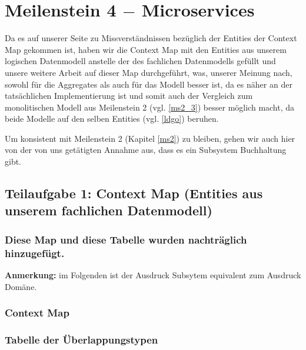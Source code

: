 \section{Meilenstein 4 $-$ Microservices}

Da es auf unserer Seite zu Missverst\"andnissen bez\"uglich
der Entities der Context Map gekommen ist, haben wir die
Context Map mit den Entities aus unserem logischen
Datenmodell anstelle der des fachlichen Datenmodells
gef\"ullt und unsere weitere Arbeit auf dieser
Map durchgef\"uhrt, was, unserer Meinung nach, sowohl f\"ur
die Aggregates als auch f\"ur das Modell besser ist, da es
n\"aher an der tats\"achlichen Implementierung ist und
somit auch der Vergleich zum monolitischen Modell aus
Meilenstein 2 (vgl. \ref{ms2_3}) besser m\"oglich macht, da
beide Modelle auf den selben Entities (vgl. \ref{ldgo})
beruhen.

Um konsistent mit Meilenstein 2 (Kapitel \ref{ms2}) zu
bleiben, gehen wir auch hier von der von uns get\"atigten
Annahme aus, dass es ein Subsystem Buchhaltung gibt.

\subsection*{Teilaufgabe 1: Context Map (Entities aus
  unserem fachlichen Datenmodell)}

\subsubsection*{Diese Map und diese Tabelle wurden
  nachtr\"aglich hinzugef\"ugt.}

\textbf{Anmerkung:} im Folgenden ist der Ausdruck Subsytem
equivalent zum Ausdruck Dom\"ane.

\subsubsection{Context Map}


\subsubsection{Tabelle der \"Uberlappungstypen}

